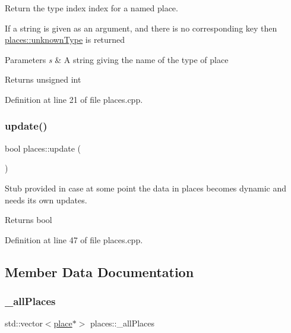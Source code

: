 Return the type index index for a named place. 

If a string is given as an argument, and there is no corresponding key then \mbox{\hyperlink{classplaces_ab03feda32ddd4784c17de8b2185b3563}{places\+::unknown\+Type}} is returned


\begin{DoxyParams}{Parameters}
{\em s} & A string giving the name of the type of place \\
\hline
\end{DoxyParams}
\begin{DoxyReturn}{Returns}
unsigned int 
\end{DoxyReturn}


Definition at line 21 of file places.\+cpp.

\mbox{\label{classplaces_a5ff3d2cd02c18f353ab15dd86f52e7be}} 
\subsubsection{\texorpdfstring{update()}{update()}}
{\footnotesize\ttfamily bool places\+::update (\begin{DoxyParamCaption}{ }\end{DoxyParamCaption})}



Stub provided in case at some point the data in places becomes dynamic and needs its own updates. 

\begin{DoxyReturn}{Returns}
bool 
\end{DoxyReturn}


Definition at line 47 of file places.\+cpp.



\subsection{Member Data Documentation}
\mbox{\label{classplaces_a2cb6b12513a2245fd06b567490229d89}} 
\subsubsection{\texorpdfstring{\+\_\+all\+Places}{\_allPlaces}}
{\footnotesize\ttfamily std\+::vector$<$\mbox{\hyperlink{classplace}{place}}$\ast$$>$ places\+::\+\_\+all\+Places\hspace{0.3cm}{\ttfamily [protected]}}



